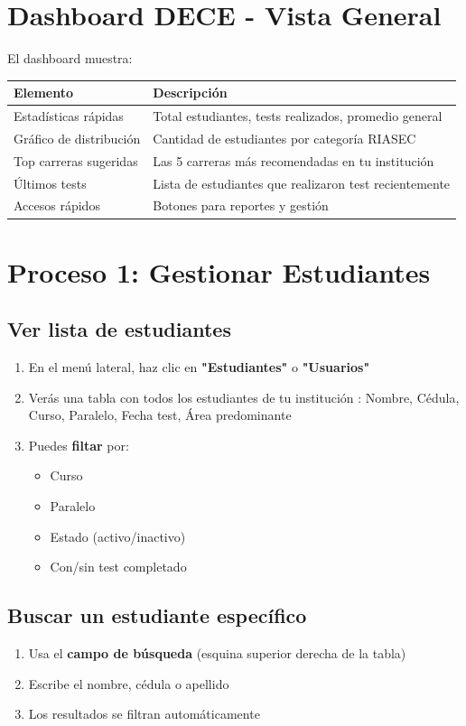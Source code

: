 \documentclass[12pt, a4paper]{report}
\begin{document}
\section{Dashboard DECE - Vista General}
El dashboard muestra:
\begin{table}[htbp]
\centering
\begin{tabularx}{\textwidth}{|l|X|}
\hline
\textbf{Elemento} & \textbf{Descripción} \\
\hline
Estadísticas rápidas & Total estudiantes, tests realizados, promedio general \\
\hline
Gráfico de distribución & Cantidad de estudiantes por categoría RIASEC \\
\hline
Top carreras sugeridas & Las 5 carreras más recomendadas en tu institución \\
\hline
Últimos tests & Lista de estudiantes que realizaron test recientemente \\
\hline
Accesos rápidos & Botones para reportes y gestión \\
\hline
\end{tabularx}
\end{table}

\section{Proceso 1: Gestionar Estudiantes}

\subsection{Ver lista de estudiantes}
\begin{enumerate}
    \item En el menú lateral, haz clic en \textbf{"Estudiantes"} o \textbf{"Usuarios"}
    \item Verás una tabla con todos los estudiantes de tu institución
    \columnas: Nombre, Cédula, Curso, Paralelo, Fecha test, Área predominante
    \item Puedes \textbf{filtar} por:
    \begin{itemize}
        \item Curso
        \item Paralelo
        \item Estado (activo/inactivo)
        \item Con/sin test completado
    \end{itemize}
\end{enumerate}

\subsection{Buscar un estudiante específico}
\begin{enumerate}
    \item Usa el \textbf{campo de búsqueda} (esquina superior derecha de la tabla)
    \item Escribe el nombre, cédula o apellido
    \item Los resultados se filtran automáticamente
\end{enumerate}
\end{document}
